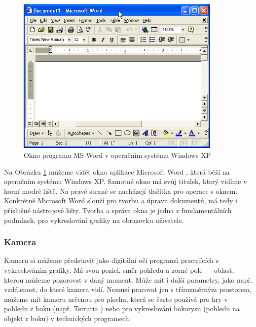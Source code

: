 \documentclass[12pt]{article}
\begin{document}
\vspace{0.5cm}
\begin{figure}[h]
    \centering
    \includegraphics[width=10cm]{xp_window.png}
    \caption[Okno programu MS Word v operačním systému Windows XP]{Okno programu MS Word v operačním systému Windows XP \cite{xp_window}}
    \label{fig:Okno programu MS Word v operačním systému Windows XP}
\end{figure}

Na Obrázku \ref{fig:Okno programu MS Word v operačním systému Windows XP} můžeme vidět okno aplikace Microsoft Word \cite{word}, která běží na operačním systému Windows XP. Samotné okno má svůj titulek, který vidíme v horní modré liště. Na pravé straně se nacházejí tlačítka pro operace s oknem. Konkrétně Microsoft Word slouží pro tvorbu a úpravu dokumentů, má tedy i příslušné nástrojové lišty. Tvorba a správa okna je jedna z fundamentálních podmínek, pro vykreslování grafiky na obrazovku uživatele.

\subsubsection{Kamera}

Kameru si můžeme představit jako digitální oči programů pracujících s vykreslováním grafiky. Má svou pozici, směr pohledu a zorné pole — oblast, kterou můžeme pozorovat v daný moment. Může mít i další parametry, jako např. vzdálenost, do které kamera vidí. Nemusí pracovat jen s třírozměrným prostorem, můžeme mít kameru určenou pro plochu, která se často používá pro hry v pohledu z boku (např. Terraria \cite{terraria}) nebo pro vykreslování bokorysu (pohledu na objekt z boku) v technických programech. \cite{camera}
\end{document}
